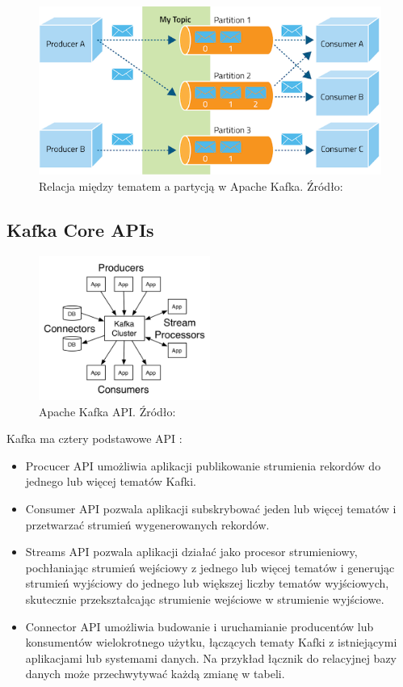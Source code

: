 \begin{figure}[h!]
  \centering
    \includegraphics[width=1.0\textwidth]{images/kafka2.png}
  \caption{Relacja między tematem a partycją w Apache Kafka. Źródło: \cite{Kafka2}}
\end{figure}

\subsection{Kafka Core APIs}
\begin{figure}[h!]
  \centering
    \includegraphics[width=0.5\textwidth]{images/kafka-apis.png}
  \caption{Apache Kafka API. Źródło: \cite{Kafka2}}
\end{figure}

Kafka ma cztery podstawowe API \cite{Streams2}:

\begin{itemize}
    \item Procucer API umożliwia aplikacji publikowanie strumienia rekordów do jednego lub więcej tematów Kafki.
    \item Consumer API pozwala aplikacji subskrybować jeden lub więcej tematów i przetwarzać strumień wygenerowanych rekordów.
    \item Streams API pozwala aplikacji działać jako procesor strumieniowy, pochłaniając strumień wejściowy z jednego lub więcej tematów i generując strumień wyjściowy do jednego lub większej liczby tematów wyjściowych, skutecznie przekształcając strumienie wejściowe w strumienie wyjściowe.
    \item Connector API umożliwia budowanie i uruchamianie producentów lub konsumentów wielokrotnego użytku, łączących tematy Kafki z istniejącymi aplikacjami lub systemami danych. Na przykład łącznik do relacyjnej bazy danych może przechwytywać każdą zmianę w tabeli.
\end{itemize}

